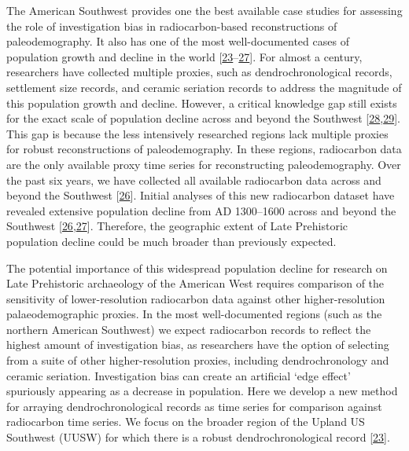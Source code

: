 \documentclass[
]{sa}
\begin{document}
The American Southwest provides one the best available case studies for assessing the role of investigation bias in radiocarbon-based reconstructions of paleodemography. It also has one of the most well-documented cases of population growth and decline in the world {[}\protect\hyperlink{ref-Bocinsky2016}{23}--\protect\hyperlink{ref-Freeman2018PNAS}{27}{]}. For almost a century, researchers have collected multiple proxies, such as dendrochronological records, settlement size records, and ceramic seriation records to address the magnitude of this population growth and decline. However, a critical knowledge gap still exists for the exact scale of population decline across and beyond the Southwest {[}\protect\hyperlink{ref-Cameron2010}{28},\protect\hyperlink{ref-Boyer2010}{29}{]}. This gap is because the less intensively researched regions lack multiple proxies for robust reconstructions of paleodemography. In these regions, radiocarbon data are the only available proxy time series for reconstructing paleodemography. Over the past six years, we have collected all available radiocarbon data across and beyond the Southwest {[}\protect\hyperlink{ref-Robinson2019}{26}{]}. Initial analyses of this new radiocarbon dataset have revealed extensive population decline from AD 1300--1600 across and beyond the Southwest {[}\protect\hyperlink{ref-Robinson2019}{26},\protect\hyperlink{ref-Freeman2018PNAS}{27}{]}. Therefore, the geographic extent of Late Prehistoric population decline could be much broader than previously expected.

The potential importance of this widespread population decline for research on Late Prehistoric archaeology of the American West requires comparison of the sensitivity of lower-resolution radiocarbon data against other higher-resolution palaeodemographic proxies. In the most well-documented regions (such as the northern American Southwest) we expect radiocarbon records to reflect the highest amount of investigation bias, as researchers have the option of selecting from a suite of other higher-resolution proxies, including dendrochronology and ceramic seriation. Investigation bias can create an artificial `edge effect' spuriously appearing as a decrease in population. Here we develop a new method for arraying dendrochronological records as time series for comparison against radiocarbon time series. We focus on the broader region of the Upland US Southwest (UUSW) for which there is a robust dendrochronological record {[}\protect\hyperlink{ref-Bocinsky2016}{23}{]}.
\end{document}
